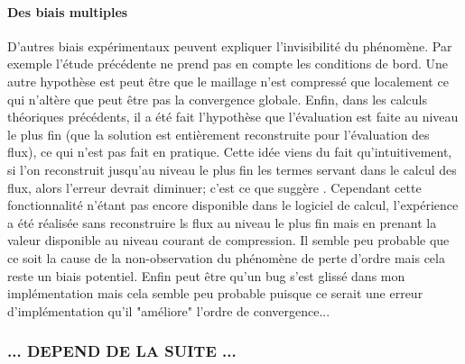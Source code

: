     \paragraph{Des biais multiples}
        D'autres biais expérimentaux peuvent expliquer l'invisibilité du phénomène.
        Par exemple l'étude précédente ne prend pas en compte les conditions de bord.
        Une autre hypothèse est peut être que le maillage n'est compressé que localement 
        ce qui n'altère que peut être pas la convergence globale. 
        Enfin, dans les calculs théoriques précédents, il a été fait l'hypothèse que l'évaluation est faite au niveau le plus fin 
        (que la solution est entièrement reconstruite pour l'évaluation des flux), ce qui n'est pas fait en pratique. Cette idée viens du fait qu'intuitivement, 
        si l'on reconstruit jusqu'au niveau le plus fin les termes servant dans le calcul des flux, alors l'erreur devrait diminuer; c'est ce que suggère \cite{belloti_et_al_2025}.
        Cependant cette fonctionnalité n'étant pas encore disponible dans le logiciel de calcul, l'expérience a été réalisée sans reconstruire ls flux au niveau 
        le plus fin mais en prenant la valeur disponible au niveau courant de compression. Il semble peu probable que ce soit la cause de la non-observation du phénomène 
        de perte d'ordre mais cela reste un biais potentiel. Enfin peut être qu'un bug s'est glissé dans mon implémentation mais cela semble peu probable 
        puisque ce serait une erreur d'implémentation qu'il "améliore" l'ordre de convergence...
\subsubsection{... DEPEND DE LA SUITE ...}